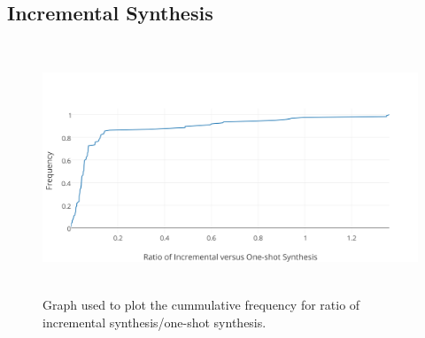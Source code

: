 \subsection{Incremental Synthesis}
\begin{figure}
	\includegraphics[height=7.5cm]{figures/incremental-cdf.png}
	\caption{Graph used to plot the cummulative frequency for ratio of incremental synthesis/one-shot synthesis.}
	\label{fig:incremental-cdf}
\end{figure}




